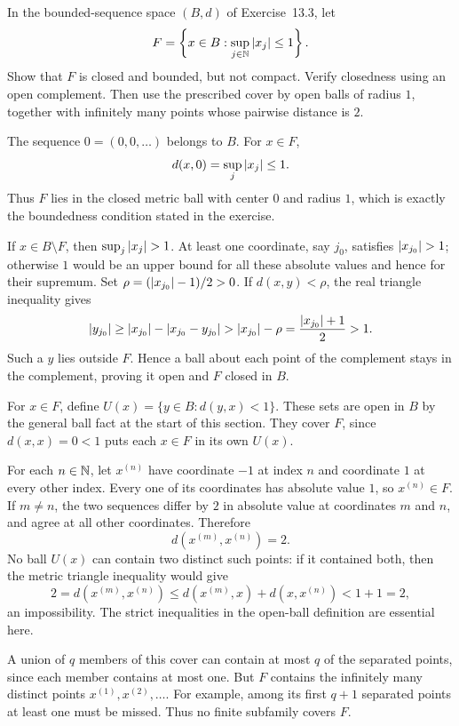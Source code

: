 \goal In the bounded-sequence space $(B,d)$ of Exercise~13.3,
let
\[
 F=\left\{x\in B:\sup_{j\in\mathbb{N}}\left|x_j\right|\le1\right\}.
\]
Show that $F$ is closed and bounded, but not compact.
\idea Verify closedness using an open complement. Then use
the prescribed cover by open balls of radius $1$, together
with infinitely many points whose pairwise distance is $2$.

The sequence $0=(0,0,\ldots)$ belongs to $B$. For $x\in F$,
\[
 d(x,0)=\sup_j\left|x_j\right|\le1.
\]
Thus $F$ lies in the closed metric ball with center $0$
and radius $1$, which is exactly the boundedness condition
stated in the exercise.

If $x\in B\setminus F$, then $\sup_j\abs{x_j}>1$.
At least one coordinate, say $j_0$, satisfies $\abs{x_{j_0}}>1$;
otherwise $1$ would be an upper bound for all these absolute
values and hence for their supremum. Set
$\rho=(\left|x_{j_0}\right|-1)/2>0$.
If $d(x,y)<\rho$, the real triangle inequality gives
\[
 \left|y_{j_0}\right|\ge\left|x_{j_0}\right|-\left|x_{j_0}-y_{j_0}\right|
 >\left|x_{j_0}\right|-\rho
 =\frac{\left|x_{j_0}\right|+1}{2}>1.
\]
Such a $y$ lies outside $F$. Hence a ball about each point
of the complement stays in the complement, proving it open
and $F$ closed in $B$.

For $x\in F$, define
$U(x)=\{y\in B:d(y,x)<1\}$. These sets are open in $B$
by the general ball fact at the start of this section.
They cover $F$, since $d(x,x)=0<1$ puts each $x\in F$
in its own $U(x)$.

For each $n\in\mathbb{N}$, let $x^{(n)}$ have coordinate $-1$
at index $n$ and coordinate $1$ at every other index.
Every one of its coordinates has absolute value $1$,
so $x^{(n)}\in F$.
If $m\ne n$, the two sequences differ by $2$ in absolute
value at coordinates $m$ and $n$, and agree at all other
coordinates. Therefore
\[
 d(x^{(m)},x^{(n)})=2.
\]
No ball $U(x)$ can contain two distinct such points: if it
contained both, then the metric triangle inequality would give
\[
 2=d(x^{(m)},x^{(n)})
 \le d(x^{(m)},x)+d(x,x^{(n)})<1+1=2,
\]
an impossibility. The strict inequalities in the open-ball
definition are essential here.

A union of $q$ members of this cover can contain at most
$q$ of the separated points, since each member contains at
most one. But $F$ contains the infinitely many distinct
points $x^{(1)},x^{(2)},\ldots$. For example, among its first
$q+1$ separated points at least one must be missed. Thus
no finite subfamily covers $F$.
